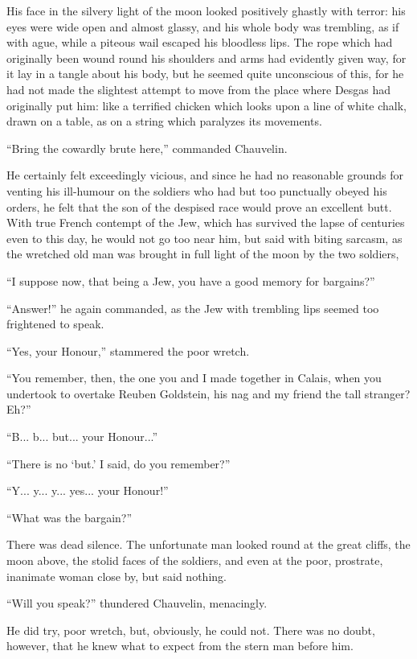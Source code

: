 His face in the silvery light of the moon looked positively ghastly with terror: his eyes were wide open and almost glassy, and his whole body was trembling, as if with ague, while a piteous wail escaped his bloodless lips. The rope which had originally been wound round his shoulders and arms had evidently given way, for it lay in a tangle about his body, but he seemed quite unconscious of this, for he had not made the slightest attempt to move from the place where Desgas had originally put him: like a terrified chicken which looks upon a line of white chalk, drawn on a table, as on a string which paralyzes its movements.

\enquote{Bring the cowardly brute here,} commanded Chauvelin.

He certainly felt exceedingly vicious, and since he had no reasonable grounds for venting his ill-humour on the soldiers who had but too punctually obeyed his orders, he felt that the son of the despised race would prove an excellent butt. With true French contempt of the Jew, which has survived the lapse of centuries even to this day, he would not go too near him, but said with biting sarcasm, as the wretched old man was brought in full light of the moon by the two soldiers,\longdash


\enquote{I suppose now, that being a Jew, you have a good memory for bargains?}

\enquote{Answer!} he again commanded, as the Jew with trembling lips seemed too frightened to speak.

\enquote{Yes, your Honour,} stammered the poor wretch.

\enquote{You remember, then, the one you and I made together in Calais, when you undertook to overtake Reuben Goldstein, his nag and my friend the tall stranger? Eh?}

\enquote{B... b... but... your Honour...}

\enquote{There is no \enquote{but.} I said, do you remember?}

\enquote{Y... y... y... yes... your Honour!}

\enquote{What was the bargain?}

There was dead silence. The unfortunate man looked round at the great cliffs, the moon above, the stolid faces of the soldiers, and even at the poor, prostrate, inanimate woman close by, but said nothing.

\enquote{Will you speak?} thundered Chauvelin, menacingly.

He did try, poor wretch, but, obviously, he could not. There was no doubt, however, that he knew what to expect from the stern man before him.

